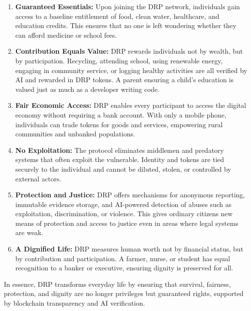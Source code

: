 \documentclass[11pt,a4paper]{article}
\begin{document}
\begin{enumerate}
    \item \textbf{Guaranteed Essentials:} Upon joining the DRP network, individuals gain access to a baseline entitlement of food, clean water, healthcare, and education credits. This ensures that no one is left wondering whether they can afford medicine or school fees.
    
    \item \textbf{Contribution Equals Value:} DRP rewards individuals not by wealth, but by participation. Recycling, attending school, using renewable energy, engaging in community service, or logging healthy activities are all verified by AI and rewarded in DRP tokens. A parent ensuring a child’s education is valued just as much as a developer writing code.
    
    \item \textbf{Fair Economic Access:} DRP enables every participant to access the digital economy without requiring a bank account. With only a mobile phone, individuals can trade tokens for goods and services, empowering rural communities and unbanked populations.
    
    \item \textbf{No Exploitation:} The protocol eliminates middlemen and predatory systems that often exploit the vulnerable. Identity and tokens are tied securely to the individual and cannot be diluted, stolen, or controlled by external actors.
    
    \item \textbf{Protection and Justice:} DRP offers mechanisms for anonymous reporting, immutable evidence storage, and AI-powered detection of abuses such as exploitation, discrimination, or violence. This gives ordinary citizens new means of protection and access to justice even in areas where legal systems are weak.
    
    \item \textbf{A Dignified Life:} DRP measures human worth not by financial status, but by contribution and participation. A farmer, nurse, or student has equal recognition to a banker or executive, ensuring dignity is preserved for all.
\end{enumerate}

In essence, DRP transforms everyday life by ensuring that survival, fairness, protection, and dignity are no longer privileges but guaranteed rights, supported by blockchain transparency and AI verification.
\end{document}
